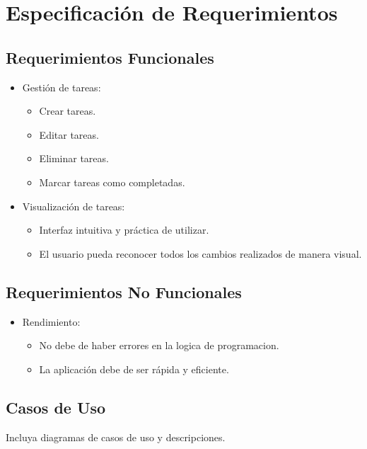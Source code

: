 	\chapter{Especificación de Requerimientos}
	\section{Requerimientos Funcionales}
    \begin{itemize}
        \item Gestión de tareas:
        \begin{itemize}
            \item Crear tareas.
            \item Editar tareas.
            \item Eliminar tareas.
            \item Marcar tareas como completadas.
        \end{itemize}
        \item Visualización de tareas:
        \begin{itemize}
            \item Interfaz intuitiva y práctica de utilizar.
            \item El usuario pueda reconocer todos los cambios realizados de manera visual.
        \end{itemize}
    \end{itemize}
	
	\section{Requerimientos No Funcionales}
	\begin{itemize}
        \item Rendimiento:
        \begin{itemize}
            \item No debe de haber errores en la logica de programacion.
            \item La aplicación debe de ser rápida y eficiente.
        \end{itemize}
    \end{itemize}
	
	\section{Casos de Uso}
	Incluya diagramas de casos de uso y descripciones.

